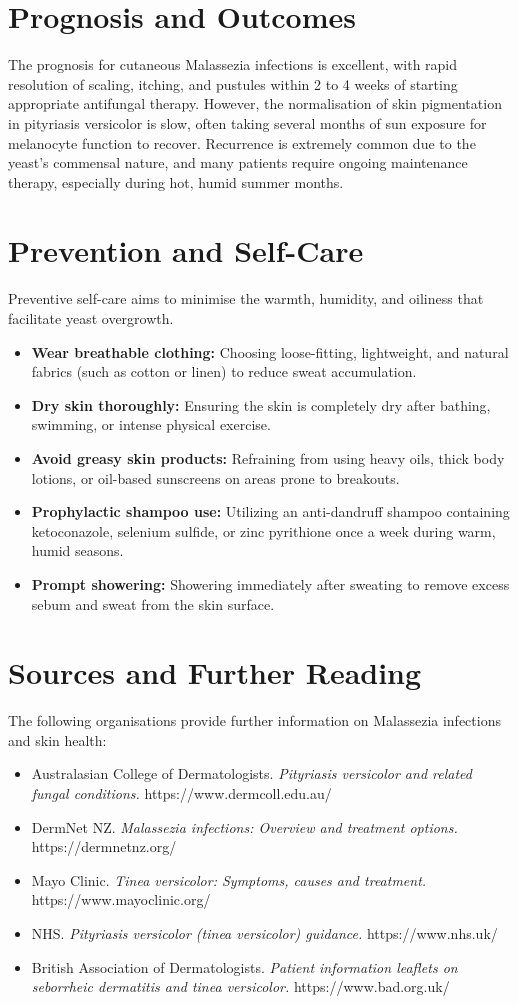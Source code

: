 \section*{Prognosis and Outcomes}
The prognosis for cutaneous Malassezia infections is excellent, with rapid resolution of scaling, itching, and pustules within 2 to 4 weeks of starting appropriate antifungal therapy. However, the normalisation of skin pigmentation in pityriasis versicolor is slow, often taking several months of sun exposure for melanocyte function to recover. Recurrence is extremely common due to the yeast's commensal nature, and many patients require ongoing maintenance therapy, especially during hot, humid summer months.

\section*{Prevention and Self-Care}
Preventive self-care aims to minimise the warmth, humidity, and oiliness that facilitate yeast overgrowth.
\begin{itemize}
    \item \textbf{Wear breathable clothing:} Choosing loose-fitting, lightweight, and natural fabrics (such as cotton or linen) to reduce sweat accumulation.
    \item \textbf{Dry skin thoroughly:} Ensuring the skin is completely dry after bathing, swimming, or intense physical exercise.
    \item \textbf{Avoid greasy skin products:} Refraining from using heavy oils, thick body lotions, or oil-based sunscreens on areas prone to breakouts.
    \item \textbf{Prophylactic shampoo use:} Utilizing an anti-dandruff shampoo containing ketoconazole, selenium sulfide, or zinc pyrithione once a week during warm, humid seasons.
    \item \textbf{Prompt showering:} Showering immediately after sweating to remove excess sebum and sweat from the skin surface.
\end{itemize}

\section*{Sources and Further Reading}
The following organisations provide further information on Malassezia infections and skin health:
\begin{itemize}
    \item Australasian College of Dermatologists. \textit{Pityriasis versicolor and related fungal conditions.} https://www.dermcoll.edu.au/
    \item DermNet NZ. \textit{Malassezia infections: Overview and treatment options.} https://dermnetnz.org/
    \item Mayo Clinic. \textit{Tinea versicolor: Symptoms, causes and treatment.} https://www.mayoclinic.org/
    \item NHS. \textit{Pityriasis versicolor (tinea versicolor) guidance.} https://www.nhs.uk/
    \item British Association of Dermatologists. \textit{Patient information leaflets on seborrheic dermatitis and tinea versicolor.} https://www.bad.org.uk/
\end{itemize}
